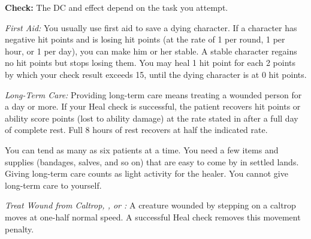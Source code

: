 \textbf{Check:} The DC and effect depend on the task you attempt.


\textit{First Aid:} You usually use first aid to save a dying character. If a character has negative hit points and is losing hit points (at the rate of 1 per round, 1 per hour, or 1 per day), you can make him or her stable. A stable character regains no hit points but stops losing them. You may heal 1 hit point for each 2 points by which your check result exceeds 15, until the dying character is at 0 hit points.

\textit{Long-Term Care:} Providing long-term care means treating a wounded person for a day or more. If your Heal check is successful, the patient recovers hit points or ability score points (lost to ability damage) at the rate stated in  after a full day of complete rest. Full 8 hours of rest recovers at half the indicated rate.


You can tend as many as six patients at a time. You need a few items and supplies (bandages, salves, and so on) that are easy to come by in settled lands. Giving long-term care counts as light activity for the healer. You cannot give long-term care to yourself.

\textit{Treat Wound from Caltrop, , or :}
A creature wounded by stepping on a caltrop moves at one-half normal speed. A successful Heal check removes this movement penalty.


